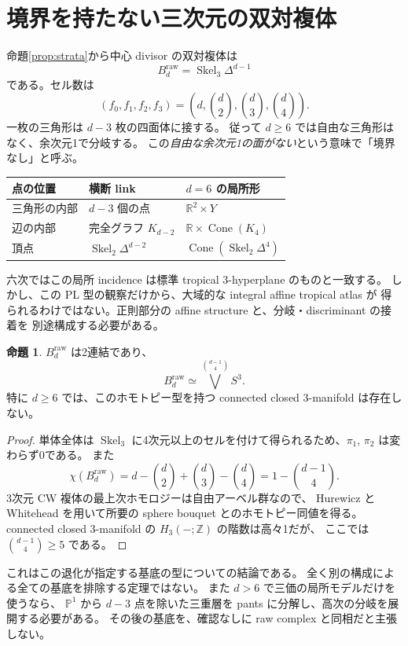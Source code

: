 \documentclass[11pt,a4paper]{article}
\theoremstyle{definition}
\newtheorem{proposition}[theorem]{命題}
\newcommand{\PP}{\mathbb P}
\newcommand{\RR}{\mathbb R}
\newcommand{\ZZ}{\mathbb Z}
\newcommand{\Cone}{\operatorname{Cone}}
\newcommand{\Sk}{\operatorname{Skel}}
\begin{document}
\section{境界を持たない三次元の双対複体}\label{sec:base}

命題\ref{prop:strata}から中心 divisor の双対複体は
\[
B_d^{\mathrm{raw}}=\Sk_3\Delta^{d-1}
\]
である。セル数は
\[
(f_0,f_1,f_2,f_3)=\left(d,\binom d2,\binom d3,\binom d4\right).
\]
一枚の三角形は $d-3$ 枚の四面体に接する。
従って $d\ge6$ では自由な三角形はなく、余次元1で分岐する。
この\emph{自由な余次元1の面がない}という意味で「境界なし」と呼ぶ。

\begin{center}
\begin{tabularx}{\linewidth}{@{}lXX@{}}
\toprule
点の位置 & 横断 link & $d=6$ の局所形\\
\midrule
三角形の内部 & $d-3$ 個の点 & $\RR^2\times Y$\\
辺の内部 & 完全グラフ $K_{d-2}$ & $\RR\times\Cone(K_4)$\\
頂点 & $\Sk_2\Delta^{d-2}$ & $\Cone(\Sk_2\Delta^4)$\\
\bottomrule
\end{tabularx}
\end{center}
六次ではこの局所 incidence は標準 tropical 3-hyperplane のものと一致する。
しかし、この PL 型の観察だけから、大域的な integral affine tropical atlas が
得られるわけではない。正則部分の affine structure と、分岐・discriminant の接着を
別途構成する必要がある。

\begin{proposition}\label{prop:homotopy}
$B_d^{\mathrm{raw}}$ は2連結であり、
\[
B_d^{\mathrm{raw}}\simeq\bigvee^{\binom{d-1}{4}}S^3.
\]
特に $d\ge6$ では、このホモトピー型を持つ connected closed 3-manifold は存在しない。
\end{proposition}

\begin{proof}
単体全体は $\Sk_3$ に4次元以上のセルを付けて得られるため、$\pi_1$, $\pi_2$ は変わらず0である。
また
\[
\chi(B_d^{\mathrm{raw}})=d-\binom d2+\binom d3-\binom d4
=1-\binom{d-1}{4}.
\]
3次元 CW 複体の最上次ホモロジーは自由アーベル群なので、
Hurewicz と Whitehead を用いて所要の sphere bouquet とのホモトピー同値を得る。
connected closed 3-manifold の $H_3(-;\ZZ)$ の階数は高々1だが、
ここでは $\binom{d-1}{4}\ge5$ である。
\end{proof}

これはこの退化が指定する基底の型についての結論である。
全く別の構成による全ての基底を排除する定理ではない。
また $d>6$ で三価の局所モデルだけを使うなら、
$\PP^1$ から $d-3$ 点を除いた三重層を pants に分解し、高次の分岐を展開する必要がある。
その後の基底を、確認なしに raw complex と同相だと主張しない。
\end{document}
